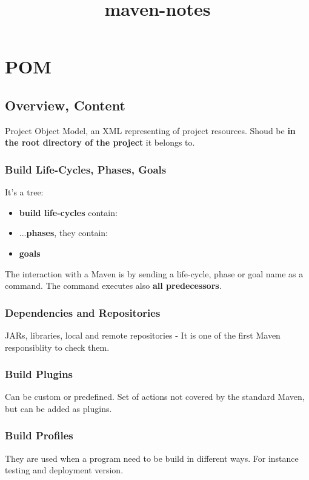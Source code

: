 \documentclass{report}
\title{maven-notes}
\begin{document}
\maketitle
{}
\tableofcontents




\part{POM}


\chapter{Overview, Content}
Project Object Model, an XML representing of project resources. Shoud be \textbf{in the root directory of the project }it belongs to.


\section{Build Life-Cycles, Phases, Goals}
It's a tree:
\begin{itemize}
	\item \textbf{build life-cycles} contain:
	\item ...\textbf{phases}, they contain:
	\item \textbf{goals}
\end{itemize}

The interaction with a Maven is by sending a life-cycle, phase or goal name as a command. The command executes also \textbf{all predecessors}.


\section{Dependencies and Repositories}
JARs, libraries, local and remote repositories - It is one of the first Maven responsiblity to check them.


\section{Build Plugins}
Can be custom or predefined. Set of actions not covered by the standard Maven, but can be added  as plugins.


\section{Build Profiles}
They are used when a program need to be build in different ways. For instance testing and deployment version.
\end{document}

